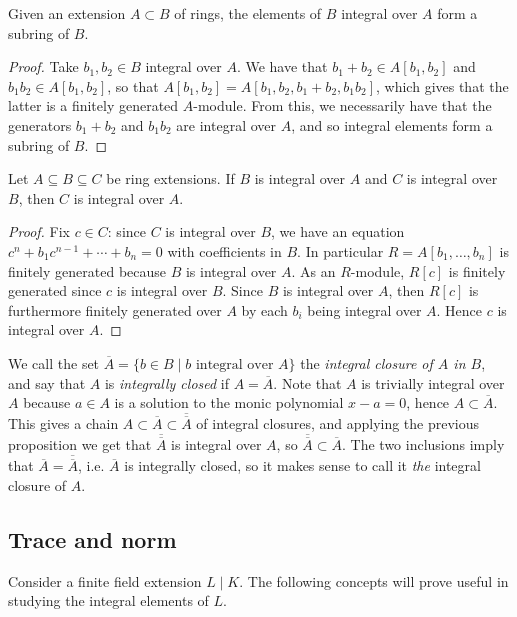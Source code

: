\begin{cor}
	Given an extension $A\subset B$ of rings, the elements of $B$ integral over $A$ form a subring of $B$.
\end{cor}
\begin{proof}
	Take $b_1,b_2\in B$ integral over $A$. We have that $b_1+b_2\in A[b_1,b_2]$ and $b_1b_2\in A[b_1,b_2]$, so that $A[b_1,b_2]=A[b_1,b_2,b_1+b_2,b_1b_2]$, which gives that the latter is a finitely generated $A$-module. From this, we necessarily have that the generators $b_1+b_2$ and $b_1b_2$ are integral over $A$, and so integral elements form a subring of $B$.
\end{proof}

\begin{prop}
	Let $A\subseteq B\subseteq C$ be ring extensions. If $B$ is integral over $A$ and $C$ is integral over $B$, then $C$ is integral over $A$.
\end{prop}
\begin{proof}
	Fix $c\in C$: since $C$ is integral over $B$, we have an equation $c^n+b_1c^{n-1}+\cdots+b_n=0$ with coefficients in $B$. In particular $R=A[b_1,\dots,b_n]$ is finitely generated because $B$ is integral over $A$. As an $R$-module, $R[c]$ is finitely generated since $c$ is integral over $B$. Since $B$ is integral over $A$, then $R[c]$ is furthermore finitely generated over $A$ by each $b_i$ being integral over $A$. Hence $c$ is integral over $A$.
\end{proof}

We call the set $\overline{A}=\{b\in B \mid b \text{ integral over } A\}$ the \emph{integral closure of $A$ in $B$}, and say that $A$ is \emph{integrally closed} if $A=\overline{A}$. Note that $A$ is trivially integral over $A$ because $a\in A$ is a solution to the monic polynomial $x-a=0$, hence $A\subset\overline{A}$. This gives a chain $A\subset \overline{A}\subset\overline{\overline{A}}$ of integral closures, and applying the previous proposition we get that $\overline{\overline{A}}$ is integral over $A$, so $\overline{\overline{A}}\subset\overline{A}$. The two inclusions imply that $\overline{A}=\overline{\overline{A}}$, i.e. $\overline{A}$ is integrally closed, so it makes sense to call it \emph{the} integral closure of $A$.


\subsection{Trace and norm}

Consider a finite field extension $L\mid K$. The following concepts will prove useful in studying the integral elements of $L$.

